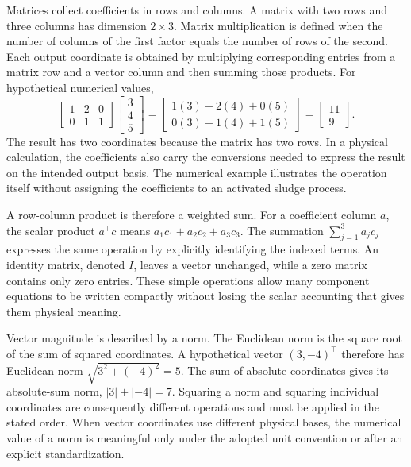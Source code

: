 Matrices collect coefficients in rows and columns. A matrix with two rows and three columns has dimension $2\times3$. Matrix multiplication is defined when the number of columns of the first factor equals the number of rows of the second. Each output coordinate is obtained by multiplying corresponding entries from a matrix row and a vector column and then summing those products. For hypothetical numerical values,
\[
\begin{bmatrix}1&2&0\\0&1&1\end{bmatrix}
\begin{bmatrix}3\\4\\5\end{bmatrix}
=\begin{bmatrix}1(3)+2(4)+0(5)\\0(3)+1(4)+1(5)\end{bmatrix}
=\begin{bmatrix}11\\9\end{bmatrix}.
\]
The result has two coordinates because the matrix has two rows. In a physical calculation, the coefficients also carry the conversions needed to express the result on the intended output basis. The numerical example illustrates the operation itself without assigning the coefficients to an activated sludge process.

A row-column product is therefore a weighted sum. For a coefficient column $a$, the scalar product $a^\top c$ means
$a_1c_1+a_2c_2+a_3c_3$. The summation
$\sum_{j=1}^3a_jc_j$ expresses the same operation by explicitly identifying the indexed terms. An identity matrix, denoted $I$, leaves a vector unchanged, while a zero matrix contains only zero entries. These simple operations allow many component equations to be written compactly without losing the scalar accounting that gives them physical meaning.

Vector magnitude is described by a norm. The Euclidean norm is the square root of the sum of squared coordinates. A hypothetical vector $(3,-4)^\top$ therefore has Euclidean norm $\sqrt{3^2+(-4)^2}=5$. The sum of absolute coordinates gives its absolute-sum norm, $|3|+|-4|=7$. Squaring a norm and squaring individual coordinates are consequently different operations and must be applied in the stated order. When vector coordinates use different physical bases, the numerical value of a norm is meaningful only under the adopted unit convention or after an explicit standardization.

